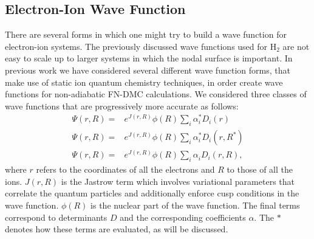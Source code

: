 \documentclass[aip,jcp,numerical,reprint]{revtex4-1}
\begin{document}
\subsection{Electron-Ion Wave Function}
 There are several forms in which one might try to build a wave function for electron-ion systems.  The previously discussed wave functions used for H$_{2}$ are not easy to scale up to larger systems in which the nodal surface is important.   %
In previous work we have considered several different wave function forms, that make use of static ion quantum chemistry techniques, in order create wave functions for non-adiabatic FN-DMC calculations. 
We considered three classes of wave functions that are progressively more accurate as follows:
\begin{align}
\Psi(r,R) =& e^{J(r,R)}\phi(R)\sum_{i}\alpha^{*}_{i} D_{i}(r) \label{eqn:wfs1}\\
\Psi(r,R) =&e^{J(r,R)}\phi(R)\sum_{i}\alpha^{*}_{i} D_{i}(r,R^{*}) \label{eqn:wfs2}\\
\Psi(r,R) =& e^{J(r,R)}\phi(R)\sum_{i}\alpha^{}_{i} D_{i}(r,R), \label{eqn:wfs3}
\end{align}
where $r$ refers to the coordinates of all the electrons and $R$ to those of all the ions.  $J(r,R)$ is the Jastrow term which involves variational parameters that correlate the quantum particles and additionally  enforce cusp conditions in the wave function.  $\phi(R)$ is the nuclear part of the wave function. The final terms correspond to determinants $D$ and the corresponding coefficients $\alpha$.    The $*$ denotes how these terms are evaluated, as will be discussed. 
\end{document}
